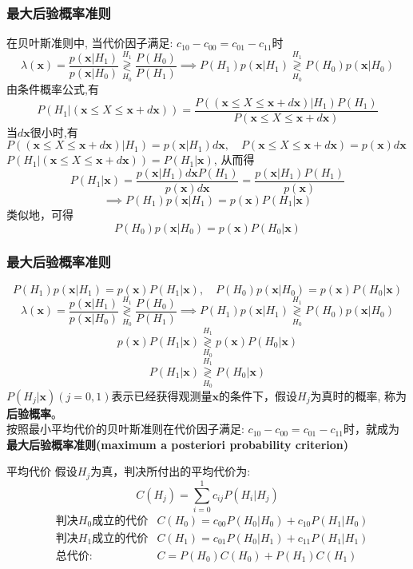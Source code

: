 \begin{frame}[shrink]
\frametitle{最大后验概率准则}
在贝叶斯准则中, 当代价因子满足: $c_{10}-c_{00}=c_{01}-c_{11}$时 
\[\lambda(\bm{x})=\frac{p(\bm{x}|H_1)}{p(\bm{x}|H_0)}\mathop{\gtrless}\limits_{H_0}^{H_1}\frac{P(H_0)}{P(H_1)}\implies P(H_1)p(\bm{x}|H_1)\mathop{\gtrless}\limits_{H_0}^{H_1}P(H_0)p(\bm{x}|H_0)\]
由条件概率公式,有
\[P(H_1|(\bm{x}\le X\le \bm{x}+d\bm{x}))=\frac{P((\bm{x}\le X\le \bm{x}+d\bm{x})|H_1)P(H_1)}{P(\bm{x}\le X\le \bm{x}+d\bm{x})}\]
当$d\bm{x}$很小时,有$P((\bm{x}\le X\le \bm{x}+d\bm{x})|H_1)=p(\bm{x}|H_1)d\bm{x},\quad P(\bm{x}\le X\le \bm{x}+d\bm{x})=p(\bm{x})d\bm{x}$\\
$P(H_1|(\bm{x}\le X\le \bm{x}+d\bm{x}))=P(H_1|\bm{x})$, 从而得
\[P(H_1|\bm{x})=\frac{p(\bm{x}|H_1)d\bm{x}P(H_1)}{p(\bm{x})d\bm{x}}=\frac{p(\bm{x}|H_1)P(H_1)}{p(\bm{x})}\]
\[\implies P(H_1)p(\bm{x}|H_1)=p(\bm{x})P(H_1|\bm{x}) \]
类似地，可得
\[P(H_0)p(\bm{x}|H_0)=p(\bm{x})P(H_0|\bm{x}) \]
\end{frame}

\begin{frame}[shrink]
\frametitle{最大后验概率准则}
\[P(H_1)p(\bm{x}|H_1)=p(\bm{x})P(H_1|\bm{x}),\quad P(H_0)p(\bm{x}|H_0)=p(\bm{x})P(H_0|\bm{x}) \]
\[\lambda(\bm{x})=\frac{p(\bm{x}|H_1)}{p(\bm{x}|H_0)}\mathop{\gtrless}\limits_{H_0}^{H_1}\frac{P(H_0)}{P(H_1)}\implies P(H_1)p(\bm{x}|H_1)\mathop{\gtrless}\limits_{H_0}^{H_1}P(H_0)p(\bm{x}|H_0)\]
\[p(\bm{x})P(H_1|\bm{x})\mathop{\gtrless}\limits_{H_0}^{H_1}p(\bm{x})P(H_0|\bm{x}) \]
\[P(H_1|\bm{x})\mathop{\gtrless}\limits_{H_0}^{H_1}P(H_0|\bm{x}) \]
$P(H_j|\bm{x})(j=0,1)$表示已经获得观测量$\bm{x}$的条件下，假设$H_j$为真时的概率, 称为\textbf{后验概率}。\\
按照最小平均代价的贝叶斯准则在代价因子满足: $c_{10}-c_{00}=c_{01}-c_{11}$时，就成为\textbf{最大后验概率准则(maximum a posteriori probability criterion)} 
\end{frame}

\begin{frame}{平均代价}
假设$H_j$为真，判决所付出的平均代价为:
\[C(H_j)=\sum\limits_{i=0}^{1}c_{ij}P(H_i|H_j) \]
\begin{align*}
&\text{判决$H_0$成立的代价} &C(H_0)=c_{00}P(H_0|H_0)+c_{10}P(H_1|H_0)\\
&\text{判决$H_1$成立的代价} &C(H_1)=c_{01}P(H_0|H_1)+c_{11}P(H_1|H_1)\\
&\text{总代价:} &C=P(H_0)C(H_0)+P(H_1)C(H_1)
\end{align*}
\end{frame}

